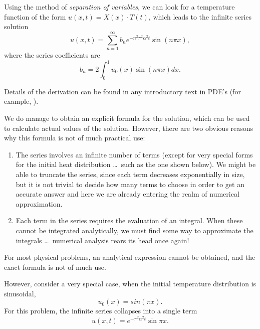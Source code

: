 \begin{example}
  Using the method of \emph{separation of variables}, we can look for a
  temperature function of the form $u(x,t)=X(x) \cdot T(t)$, which leads to
  the infinite series solution
  \[
    u(x,t) = \sum_{n=1}^\infty b_n e^{-n^2\pi^2\alpha^2 t}\sin{(n\pi x)},
  \]
  where the series coefficients are
  \[
    b_n = 2 \int_0^1 u_0(x) \sin{(n\pi x)} dx.
  \]
\begin{latexonly}
\end{latexonly} 
  
  \begin{mathnote}
    Details of the derivation can be found in any introductory text in
    PDE's (for example, \cite[p.~549]{boyce-diprima}).  
  \end{mathnote}

  We do manage to obtain an explicit formula for the solution, which can
  be used to calculate actual values of the solution.  However, there
  are two obvious reasons why this formula is not of much
  practical use:
  \begin{enumerate}
  \item The series involves an infinite number of terms (except for
    very special forms for the initial heat distribution \dots\ such as
    the one shown below).  
    We might be able to truncate the series, since each term
    decreases exponentially in size, but it is not trivial to decide
    how many terms to choose in order to get an accurate answer and 
    here we are already entering the realm of numerical
    approximation.  
  \item Each term in the series requires the evaluation of an
    integral.  When these cannot be integrated analytically, we must
    find some way to approximate the integrals \dots\ numerical
    analysis rears its head once again!
  \end{enumerate}
  For most physical problems, an analytical expression cannot be
  obtained, and the exact formula is not of much use.  

  However, consider a very special case, when 
  the initial temperature distribution is sinusoidal, \ie
  \[
    u_0(x) = sin(\pi x).
  \]
  For this problem, the infinite series collapses into a single term
  \[
    u(x,t) = e^{-\pi^2\alpha^2t}\sin{\pi x}.
  \]


\end{example}
